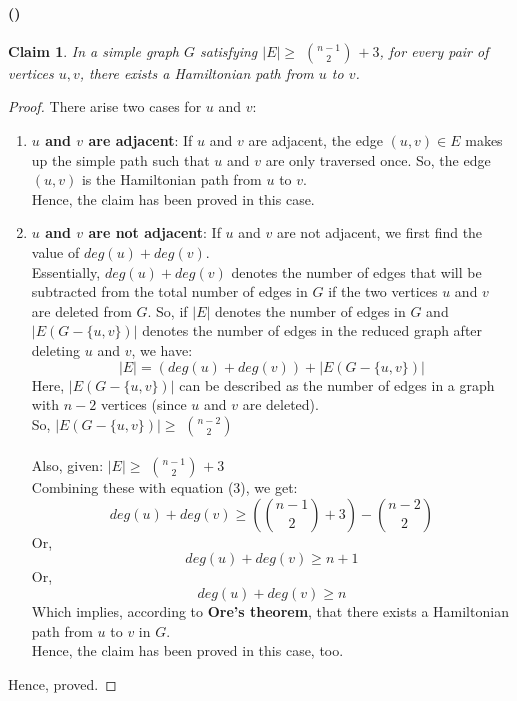 \documentclass[a4paper]{article}
\newcounter{solution}
\newcounter{subsolution}[solution]
\newcommand{\subsolution}{\paragraph{(\protect\stepcounter{subsolution}\arabic{subsolution})}}
\newtheorem{claim}{Claim}[solution]
\begin{document}
\subsolution{}
\begin{claim}
	In a simple graph $G$ satisfying $|E| \geq$ $n - 1 \choose 2$ $+\ 3$, for every pair of vertices $u, v$, there exists a Hamiltonian path from $u$ to $v$.
\end{claim}
\begin{proof}
	There arise two cases for $u$ and $v$:
	\begin{enumerate}
		\item \textbf{$u$ and $v$ are adjacent}: If $u$ and $v$ are adjacent, the edge $(u, v) \in E$ makes up the simple path such that $u$ and $v$ are only traversed once. So, the edge $(u, v)$ is the Hamiltonian path from $u$ to $v$.\\
		Hence, the claim has been proved in this case.
		\item \textbf{$u$ and $v$ are not adjacent}: If $u$ and $v$ are not adjacent, we first find the value of $deg(u) + deg(v)$.\\
		Essentially, $deg(u) + deg(v)$ denotes the number of edges that will be subtracted from the total number of edges in $G$ if the two vertices $u$ and $v$ are deleted from $G$.
		So, if $|E|$ denotes the number of edges in $G$ and $|E(G - \{u, v\})|$ denotes the number of edges in the reduced graph after deleting $u$ and $v$, we have:
		\begin{equation}
			|E| = (deg(u) + deg(v)) + |E(G - \{u, v\})| 
		\end{equation}
		Here, $|E(G - \{u, v\})|$ can be described as the number of edges in a graph with $n - 2$ vertices (since $u$ and $v$ are deleted).\\
		So, $|E(G - \{u, v\})| \geq$ $n - 2 \choose 2$\\\\
		Also, given: $|E| \geq$ $n - 1 \choose 2$ $+\ 3$\\
		Combining these with equation (3), we get:
		\begin{equation}
			deg(u) + deg(v) \geq ({n - 1 \choose 2} + 3) - {n - 2 \choose 2}
		\end{equation}
		Or,
		\begin{equation}
			deg(u) + deg(v) \geq n + 1
		\end{equation}
		Or,
		\begin{equation}
			deg(u) + deg(v) \geq n
		\end{equation}
		Which implies, according to \textbf{Ore's theorem}, that there exists a Hamiltonian path from $u$ to $v$ in $G$.\\
		Hence, the claim has been proved in this case, too.
	\end{enumerate}
	Hence, proved.
\end{proof}
\end{document}
